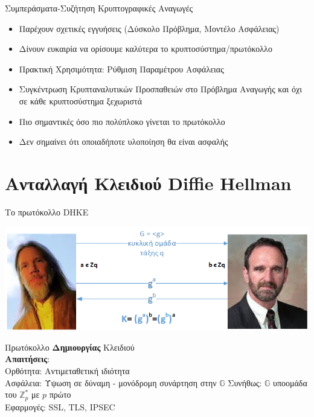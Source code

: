 \documentclass[handout]{beamer}
\begin{document}
\begin{frame}{Συμπεράσματα-Συζήτηση}
Κρυπτογραφικές Αναγωγές
\begin{itemize}
\item Παρέχουν σχετικές εγγυήσεις (Δύσκολο Πρόβλημα, Μοντέλο Ασφάλειας)
\item Δίνουν ευκαιρία να ορίσουμε καλύτερα το κρυπτοσύστημα/πρωτόκολλο
\item Πρακτική Χρησιμότητα: Ρύθμιση Παραμέτρου Ασφάλειας
\item Συγκέντρωση Κρυπταναλυτικών Προσπαθειών στο Πρόβλημα Αναγωγής και όχι σε κάθε κρυπτοσύστημα ξεχωριστά
\item Πιο σημαντικές όσο πιο πολύπλοκο γίνεται το πρωτόκολλο
\item Δεν σημαίνει ότι οποιαδήποτε υλοποίηση θα είναι ασφαλής
\end{itemize}
\end{frame}\section{Ανταλλαγή Κλειδιού Diffie Hellman}
\begin{frame}{Το πρωτόκολλο DHKE}
\begin{center}
\includegraphics[scale=0.55]{dh.png}
\end{center} 
\pause
Πρωτόκολλο \textbf{Δημιουργίας} Κλειδιού \\
\pause
\textbf{Απαιτήσεις}: \\
Ορθότητα: Αντιμεταθετική ιδιότητα \\
Ασφάλεια: Ύψωση σε δύναμη - μονόδρομη συνάρτηση στην $\mathbb{G}$
\pause 
Συνήθως: $\mathbb{G}$ υποομάδα του $\mathbb{Z}_p^*$ με $p$ πρώτο\\
\pause
Εφαρμογές: SSL, TLS, IPSEC
\end{frame}
\end{document}
